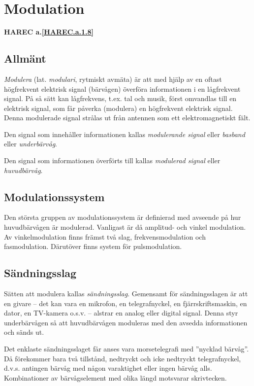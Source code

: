 \section{Modulation}
\textbf{HAREC a.\ref{HAREC.a.1.8}\label{myHAREC.a.1.8}}
\label{modulation}

\subsection{Allmänt}

\emph{Modulera} (lat. \emph{modulari}, rytmiskt avmäta) är att med hjälp av en
oftast högfrekvent elektrisk signal (bärvågen) överföra informationen i en
lågfrekvent signal. På så sätt kan lågfrekvens, t.ex. tal och musik, först
omvandlas till en elektrisk signal, som får påverka (modulera) en högfrekvent
elektrisk signal. Denna modulerade signal strålas ut från antennen som ett
elektromagnetiskt fält.

Den signal som innehåller informationen kallas \emph{modulerande signal} eller
\emph{basband} eller \emph{underbärvåg}.

Den signal som informationen överförts till kallas \emph{modulerad signal}
eller \emph{huvudbärvåg}.

\subsection{Modulationssystem}

Den största gruppen av modulationssystem är definierad med avseende på hur
huvudbärvågen är modulerad. Vanligast är då amplitud- och vinkel modulation.
Av vinkelmodulation finns främst två slag, frekvensmodulation och
fasmodulation. Därutöver finns system för pulsmodulation.

\subsection{Sändningsslag}

Sätten att modulera kallas \emph{sändningsslag}. Gemensamt för sändningsslagen
är att en givare -- det kan vara en mikrofon, en telegrafnyckel, en
fjärrskriftsmaskin, en dator, en TV-kamera o.s.v. -- alstrar en analog eller
digital signal. Denna styr underbärvågen så att huvudbärvågen moduleras med den
avsedda informationen och sänds ut.

Det enklaste sändningsslaget får anses vara morsetelegrafi med ''nycklad bärvåg''.
Då förekommer bara två tillstånd, nedtryckt och icke nedtryckt telegrafnyckel,
d.v.s. antingen bärvåg med någon varaktighet eller ingen bärvåg alls.
Kombinationer av bärvågselement med olika längd motsvarar skrivtecken.


